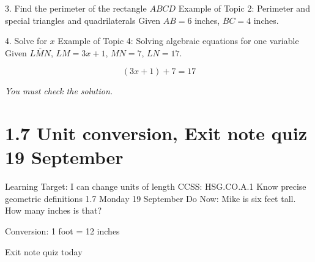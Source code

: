 \begin{frame}{3. Find the perimeter of the rectangle $ABCD$}
  {Example of Topic 2: Perimeter and special triangles and quadrilaterals}
  Given $AB=6$ inches, $BC=4$ inches.
  \begin{center}
  \end{center}
  \end{frame}

\begin{frame}{4. Solve for $x$}
  {Example of Topic 4: Solving algebraic equations for one variable}
  Given $\overline{LMN}$, $LM=3x+1$, $MN=7$, $LN=17$.
    \begin{flushleft}
    \end{flushleft}
  \large \[ (3x+1)+7=17 \] \par \vspace{2cm}
  \emph{You must check the solution.}
  \end{frame}

\section{1.7 Unit conversion, Exit note quiz \hfill 19 September}
\begin{frame}{Learning Target: I can change units of length}
  {CCSS: HSG.CO.A.1 Know precise geometric definitions  \hfill \alert{1.7 Monday 19 September}}
  Do Now: Mike is six feet tall. How many inches is that? \par \medskip
  Conversion: 1 foot = 12 inches \par
  \vspace{3cm}
  \alert{Exit note quiz today}
  \end{frame}

